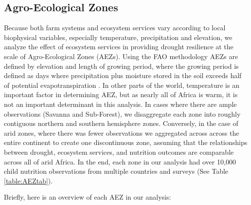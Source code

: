 \documentclass{article}
\begin{document}
\subsection{Agro-Ecological Zones}
Because both farm systems and ecosystem services vary according to local biophysical variables, especially temperature, precipitation and elevation, we analyze the effect of ecosystem services in providing drought resilience at the scale of Agro-Ecological Zones (AEZs).  Using the FAO methodology \cite{Fischer2006} AEZs are defined by elevation and length of growing period, where the growing period is defined as days where precipitation plus moisture stored in the soil exceeds half of potential evapotranspiration \cite{Fischer2006}.  In other parts of the world, temperature is an important factor in determining AEZ, but as nearly all of Africa is warm, it is not an important determinant in this analysis.  In cases where there are ample observations (Savanna and Sub-Forest), we disaggregate each zone into roughly contiguous northern and southern hemisphere zones.  Conversely, in the case of arid zones, where there was fewer observations we aggregated across across the entire continent to create one discontinuous zone, assuming that the relationships between drought, ecosystem services, and nutrition outcomes are comparable across all of arid Africa.  In the end, each zone in our analysis had over 10,000 child nutrition observations from multiple countries and surveys (See Table \ref{table:AEZtab}).

Briefly, here is an overview of each AEZ in our analysis:
\end{document}
